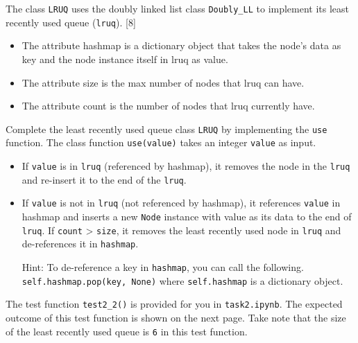 The class \texttt{LRUQ} uses the doubly linked list class \texttt{Doubly\_LL}
to implement its least recently used queue (\texttt{lruq}). \hfill{}{[}8{]}
\begin{itemize}
\item The attribute hashmap is a dictionary object that takes the node's
data as key and the node instance itself in lruq as value. 
\item The attribute size is the max number of nodes that lruq can have.
\item The attribute count is the number of nodes that lruq currently have. 
\end{itemize}
Complete the least recently used queue class \texttt{LRUQ} by implementing
the \texttt{use} function. The class function \texttt{use(value)}
takes an integer \texttt{value} as input. 
\begin{itemize}
\item If \texttt{value} is in \texttt{lruq} (referenced by hashmap), it
removes the node in the \texttt{lruq} and re-insert it to the end
of the \texttt{lruq}. 
\item If \texttt{value} is not in \texttt{lruq} (not referenced by hashmap),
it references \texttt{value} in hashmap and inserts a new \texttt{Node}
instance with value as its data to the end of \texttt{lruq}. If \texttt{count}
> \texttt{size}, it removes the least recently used node in \texttt{lruq}
and de-references it in \texttt{hashmap}. 

Hint: To de-reference a key in \texttt{hashmap}, you can call the
following. \texttt{self.hashmap.pop(key, None)} where \texttt{self.hashmap}
is a dictionary object. 
\end{itemize}
The test function \texttt{test2\_2()} is provided for you in \texttt{task2.ipynb}.
The expected outcome of this test function is shown on the next page.
Take note that the size of the least recently used queue is \texttt{6}
in this test function. 

